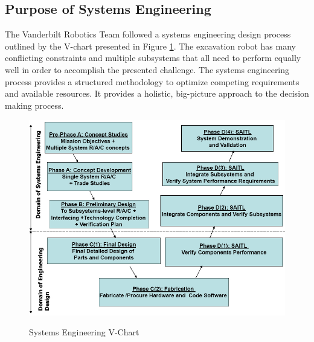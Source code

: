 \documentclass[class=article, crop=false]{standalone}
\begin{document}
	\subsection{Purpose of Systems Engineering}
	\label{subsec:systems_engineering_purpose}
	The Vanderbilt Robotics Team followed a systems engineering design process outlined by the V-chart presented in Figure \ref{fig:safety_protocol_flowsheet}. The excavation robot has many conflicting constraints and multiple subsystems that all need to perform equally well in order to accomplish the presented challenge. The systems engineering process provides a structured methodology to optimize competing requirements and available resources. It provides a holistic, big-picture approach to the decision making process. 
	
	\FloatBarrier
		\begin{figure}[h]
			\centering
			\includegraphics[width=.50\linewidth]{09_Figures/systems_engineering_vee_chart.jpg}
			\caption{Systems Engineering V-Chart} \cite{syseng}
			\label{fig:safety_protocol_flowsheet}
		\end{figure}
		\FloatBarrier


	
\end{document}
